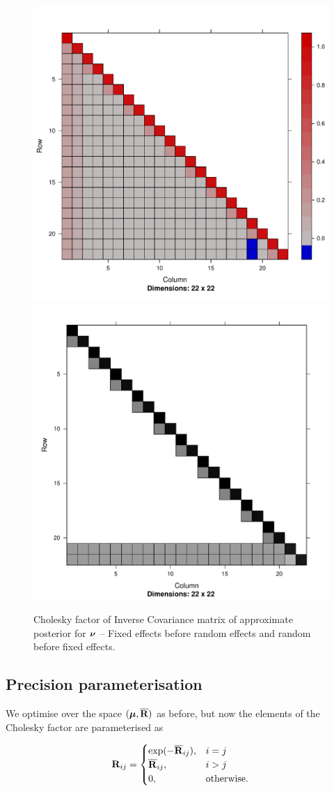 \begin{figure}[h!]
	\includegraphics[width=0.45 \textwidth]{mX_mZ_cholesky.pdf}
	\includegraphics[width=0.45 \textwidth]{mZ_mX_cholesky.pdf}
	\caption{Cholesky factor of Inverse Covariance matrix of approximate posterior for ${\boldsymbol \nu}$ -- Fixed effects 
						before random effects and random before fixed effects.}
	\label{fig:cholfixedrandom}
\end{figure}

\subsection{Precision parameterisation}

We optimise over the space $({\boldsymbol \mu}, \overline{{\bf R}})$ as before, but now the
elements of the Cholesky factor are parameterised as
		
\begin{equation*}
\label{eq:cholesky_element_precision_param}
	{\bf R}_{ij} =
	\begin{cases}
		\exp(-\overline{{\bf R}}_{ij}), & i = j             \\
		\overline{{\bf R}}_{ij},        & i > j             \\
		0,                          & \text{otherwise}.
	\end{cases}
\end{equation*}
	
